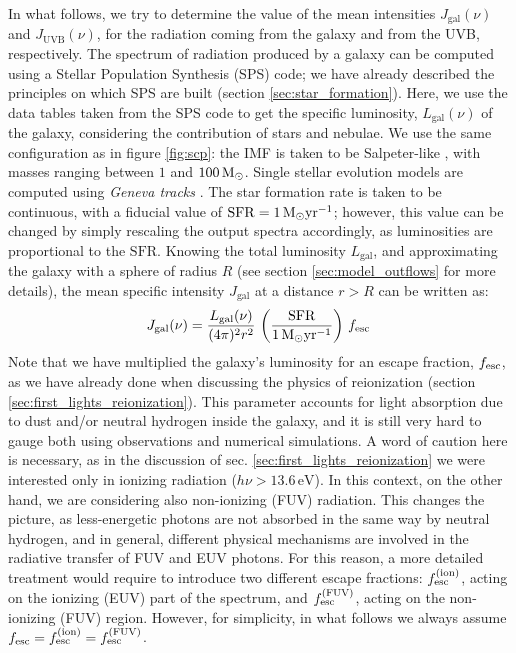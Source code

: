 In what follows, we try to determine the value of the mean intensities $J_\mathrm{gal}(\nu)$ and $J_\mathrm{UVB}(\nu)$, for the radiation coming from the galaxy and from the UVB, respectively. The spectrum of radiation produced by a galaxy can be computed using a Stellar Population Synthesis (SPS) code; we have already described the principles on which SPS are built (section \ref{sec:star_formation}). Here, we use the data tables taken from the SPS code  \citep{leitherer1999} to get the specific luminosity, $L_\mathrm{gal}(\nu)$ of the galaxy, considering the contribution of stars and nebulae. We use the same configuration as in figure \ref{fig:scp}: the IMF is taken to be Salpeter-like \citet{salpeter1955}, with masses ranging between $1$ and $100\,{\rm M}_{\odot}$. Single stellar evolution models are computed using \textit{Geneva tracks} \citep{schaerer1993}. The star formation rate is taken to be continuous, with a fiducial value of $\mathrm{SFR}=1 \, {\rm M}_{\odot} \rm yr^{-1}$; however, this value can be changed by simply rescaling the output spectra accordingly, as luminosities are proportional to the $\mathrm{SFR}$. 
Knowing the total luminosity $L_\mathrm{gal}$, and approximating the galaxy with a sphere of radius $R$ (see section \ref{sec:model_outflows} for more details), the mean specific intensity $J_\mathrm{gal}$ at a distance $r>R$ can be written as:
\begin{align}
J_\mathrm{gal}(\nu) =\frac{L_\mathrm{gal}(\nu)}{(4\pi)^2r^2}\,  \left(\frac{\mathrm{SFR}}{1\,{\rm M}_{\odot}\mathrm{yr}^{-1}}\right) \,f_{\rm esc}\,
\end{align}
Note that we have multiplied the galaxy's luminosity for an escape fraction, $f_{\rm esc}$, as we have already done when discussing the physics of reionization (section \ref{sec:first_lights_reionization}). This parameter accounts for light absorption due to dust and/or neutral hydrogen inside the galaxy, and it is still very hard to gauge both using observations and numerical simulations. 
A word of caution here is necessary, as in the discussion of sec. \ref{sec:first_lights_reionization} we were interested only in ionizing radiation ($h\nu>13.6\,\mathrm{eV}$). In this context, on the other hand, we are considering also non-ionizing (FUV) radiation. This changes the picture, as less-energetic photons are not absorbed in the same way by neutral hydrogen, and in general, different physical mechanisms are involved in the radiative transfer of FUV and EUV photons. For this reason, a more detailed treatment would require to introduce two different escape fractions: $f_{\rm esc}^\mathrm{(ion)}$, acting on the ionizing (EUV) part of the spectrum, and $f_{\rm esc}^\mathrm{(FUV)}$, acting on the non-ionizing (FUV) region. However, for simplicity, in what follows we always assume $f_{\rm esc} = f_{\rm esc}^\mathrm{(ion)}=f_{\rm esc}^\mathrm{(FUV)}$. 

